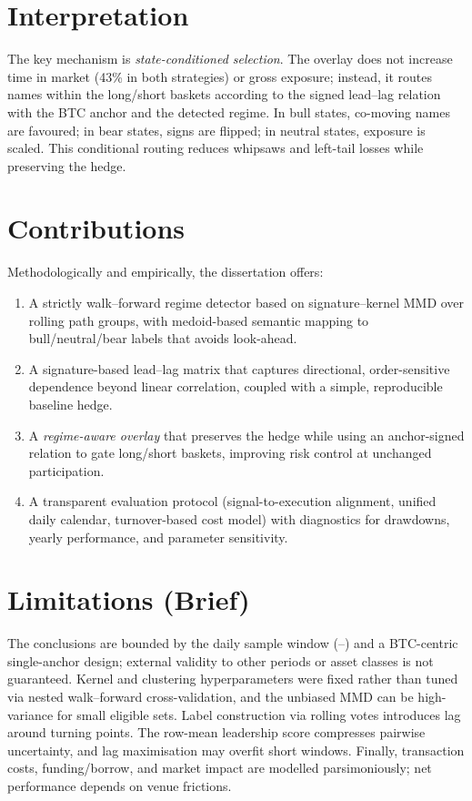 \section*{Interpretation}
The key mechanism is \emph{state-conditioned selection}. The overlay does not increase time in market (43\% in both strategies) or gross exposure; instead, it routes names within the long/short baskets according to the signed lead–lag relation with the BTC anchor and the detected regime. In bull states, co-moving names are favoured; in bear states, signs are flipped; in neutral states, exposure is scaled. This conditional routing reduces whipsaws and left-tail losses while preserving the hedge.

\section*{Contributions}
Methodologically and empirically, the dissertation offers:
\begin{enumerate}
  \item A strictly walk–forward regime detector based on signature–kernel MMD over rolling path groups, with medoid-based semantic mapping to bull/neutral/bear labels that avoids look-ahead.
  \item A signature-based lead–lag matrix that captures directional, order-sensitive dependence beyond linear correlation, coupled with a simple, reproducible baseline hedge.
  \item A \emph{regime-aware overlay} that preserves the hedge while using an anchor-signed relation to gate long/short baskets, improving risk control at unchanged participation.
  \item A transparent evaluation protocol (signal-to-execution alignment, unified daily calendar, turnover-based cost model) with diagnostics for drawdowns, yearly performance, and parameter sensitivity.
\end{enumerate}

\section*{Limitations (Brief)}
The conclusions are bounded by the daily sample window (\sampleStart{}–\sampleEnd{}) and a BTC-centric single-anchor design; external validity to other periods or asset classes is not guaranteed. Kernel and clustering hyperparameters were fixed rather than tuned via nested walk–forward cross-validation, and the unbiased MMD can be high-variance for small eligible sets. Label construction via rolling votes introduces lag around turning points. The row-mean leadership score compresses pairwise uncertainty, and lag maximisation may overfit short windows. Finally, transaction costs, funding/borrow, and market impact are modelled parsimoniously; net performance depends on venue frictions.

